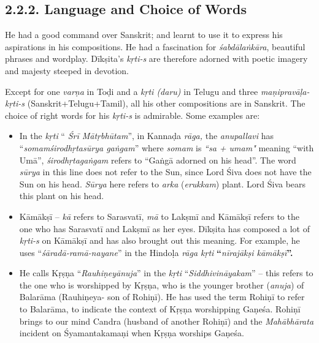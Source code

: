\subsection*{2.2.2. Language and Choice of Words}

He had a good command over Sanskrit; and learnt to use it to express his aspirations in his compositions. He had a fascination for \textit{śabdālaṅkāra}, beautiful phrases and wordplay. Dīkṣita’s \textit{kṛti-s} are therefore adorned with poetic imagery and majesty steeped in devotion.

Except for one \textit{varṇa} in Toḍi and a\textit{ kṛti (daru)} in Telugu and three \textit{maṇipravāḷa- kṛti-s} (Sanskrit+Telugu+Tamil), all his other compositions are in Sanskrit. The choice of right words for his \textit{kṛti-s} is admirable. Some examples are:

\begin{itemize}

 \item In the \textit{kṛti} “ \textit{Śrī Mātṛbhūtam}”, in Kannaḍa \textit{rāga,} the \textit{anupallavi} has “\textit{somamśirodhṛtasūrya gaṅgam}” where \textit{somam} is \textit{“sa + umam"} meaning “with Umā”, \textit{ śirodhṛtagaṅgam} refers to “Gaṅgā adorned on his head”. The word \textit{sūrya} in this line does not refer to the Sun, since Lord Śiva does not have the Sun on his head. \textit{Sūrya} here refers to \textit{arka} (\textit{erukkam}) plant. Lord Śiva bears this plant on his head.

 \item Kāmākṣī – \textit{kā} refers to Sarasvatī, \textit{mā} to Lakṣmī and Kāmākṣī refers to the one who has Sarasvatī and Lakṣmī as her eyes. Dīkṣita has composed a lot of \textit{kṛti-s} on Kāmākṣī and has also brought out this meaning. For example, he uses “\textit{śāradā-ramā-nayane}” in the Hindoḷa\textit{ rāga kṛti} \textbf{“}\textit{nīrajākṣi kāmākṣī}\textbf{”.}

 \item He calls Kṛṣṇa “\textit{Rauhiṇeyānuja}” in the \textit{kṛti} “\textit{Siddhivināyakam}” – this refers to the one who is worshipped by Kṛṣṇa, who is the younger brother (\textit{anuja}) of Balarāma (Rauhiṇeya- son of Rohiṇī). He has used the term Rohiṇī to refer to Balarāma, to indicate the context of Kṛṣṇa worshipping Gaṇeśa. Rohiṇī brings to our mind Candra (husband of another Rohiṇī) and the \textit{Mahābhārata} incident on Śyamantakamaṇi when Kṛṣṇa worships Gaṇeśa.

\end{itemize}


